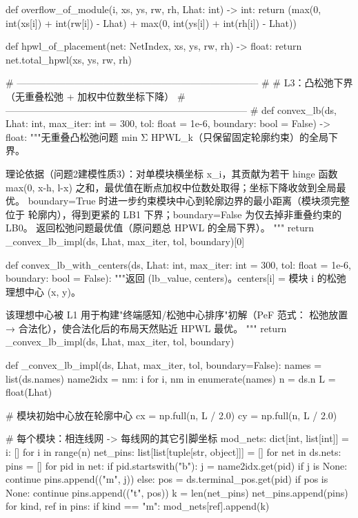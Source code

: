 \documentclass{JXUSTmodeling}
\begin{document}
\begin{appendixx}
\begin{python}
def overflow_of_module(i, xs, ys, rw, rh, Lhat: int) -> int:
    return (max(0, int(xs[i]) + int(rw[i]) - Lhat)
            + max(0, int(ys[i]) + int(rh[i]) - Lhat))


def hpwl_of_placement(net: NetIndex, xs, ys, rw, rh) -> float:
    return net.total_hpwl(xs, ys, rw, rh)


# --------------------------------------------------------------------------- #
# L3：凸松弛下界（无重叠松弛 + 加权中位数坐标下降）
# --------------------------------------------------------------------------- #
def convex_lb(ds, Lhat: int, max_iter: int = 300, tol: float = 1e-6,
              boundary: bool = False) -> float:
    """无重叠凸松弛问题 min Σ HPWL_k（只保留固定轮廓约束）的全局下界。

    理论依据（问题2建模性质3）：对单模块横坐标 x_i，其贡献为若干 hinge 函数
    max(0, x-h, l-x) 之和，最优值在断点加权中位数处取得；坐标下降收敛到全局最优。
    boundary=True 时进一步约束模块中心到轮廓边界的最小距离（模块须完整位于
    轮廓内），得到更紧的 LB1 下界；boundary=False 为仅去掉非重叠约束的 LB0。
    返回松弛问题最优值（原问题总 HPWL 的全局下界）。
    """
    return _convex_lb_impl(ds, Lhat, max_iter, tol, boundary)[0]


def convex_lb_with_centers(ds, Lhat: int, max_iter: int = 300,
                           tol: float = 1e-6, boundary: bool = False):
    """返回 (lb_value, centers)。centers[i] = 模块 i 的松弛理想中心 (x, y)。

    该理想中心被 L1 用于构建"终端感知/松弛中心排序"初解（PeF 范式：
    松弛放置 → 合法化），使合法化后的布局天然贴近 HPWL 最优。
    """
    return _convex_lb_impl(ds, Lhat, max_iter, tol, boundary)


def _convex_lb_impl(ds, Lhat, max_iter, tol, boundary=False):
    names = list(ds.names)
    name2idx = {nm: i for i, nm in enumerate(names)}
    n = ds.n
    L = float(Lhat)

    # 模块初始中心放在轮廓中心
    cx = np.full(n, L / 2.0)
    cy = np.full(n, L / 2.0)

    # 每个模块：相连线网 -> 每线网的其它引脚坐标
    mod_nets: dict[int, list[int]] = {i: [] for i in range(n)}
    net_pins: list[list[tuple[str, object]]] = []
    for net in ds.nets:
        pins = []
        for pid in net:
            if pid.startswith("b"):
                j = name2idx.get(pid)
                if j is None:
                    continue
                pins.append(("m", j))
            else:
                pos = ds.terminal_pos.get(pid)
                if pos is None:
                    continue
                pins.append(("t", pos))
        k = len(net_pins)
        net_pins.append(pins)
        for kind, ref in pins:
            if kind == "m":
                mod_nets[ref].append(k)


\end{python}
\end{appendixx}
\end{document}
